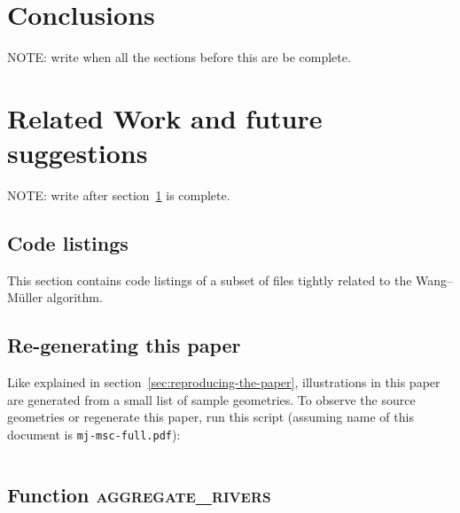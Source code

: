 \documentclass[a4paper]{article}
\newcommand{\inputcode}[2]{\inputminted[fontsize=\small]{#1}{#2}}
\newcommand{\inputcode}[2]{}
\newcommand{\WM}{Wang--M{\"u}ller}
\begin{document}
\section{Conclusions}
\label{sec:conclusions}

NOTE: write when all the sections before this are be complete.

\section{Related Work and future suggestions}
\label{sec:related_work}

NOTE: write after section~\ref{sec:conclusions} is complete.

\printbibliography

\begin{appendices}

\section{Code listings}

This section contains code listings of a subset of files tightly related to the
    {\WM} algorithm.

\subsection{Re-generating this paper}
\label{sec:code-regenerate}

Like explained in section~\ref{sec:reproducing-the-paper}, illustrations in
    this paper are generated from a small list of sample geometries. To observe
    the source geometries or regenerate this paper, run this script (assuming
    name of this document is {\tt mj-msc-full.pdf}):

\inputcode{bash}{extract-and-generate}


\subsection{Function \textsc{aggregate\_rivers}}
\inputcode{postgresql}{aggregate-rivers.sql}

\end{appendices}
\end{document}
